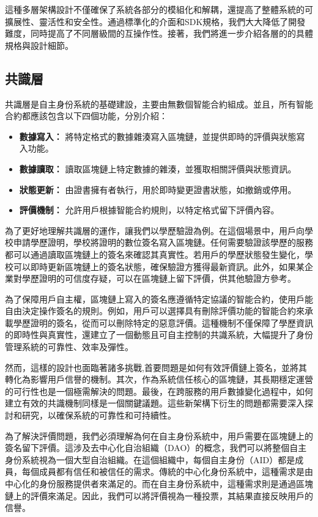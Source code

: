這種多層架構設計不僅確保了系統各部分的模組化和解耦，還提高了整體系統的可擴展性、靈活性和安全性。通過標準化的介面和SDK規格，我們大大降低了開發難度，同時提高了不同層級間的互操作性。接著，我們將進一步介紹各層的的具體規格與設計細節。
\subsection{共識層}
共識層是自主身份系統的基礎建設，主要由無數個智能合約組成。並且，所有智能合約都應該包含以下四個功能，分別介紹：
\begin{itemize}
  \item \textbf{數據寫入：} 將特定格式的數據雜湊寫入區塊鏈，並提供即時的評價與狀態寫入功能。
  \item \textbf{數據讀取：} 讀取區塊鏈上特定數據的雜湊，並獲取相關評價與狀態資訊。
  \item \textbf{狀態更新：} 由證書擁有者執行，用於即時變更證書狀態，如撤銷或停用。
  \item \textbf{評價機制：} 允許用戶根據智能合約規則，以特定格式留下評價內容。
\end{itemize}
為了更好地理解共識層的運作，讓我們以學歷驗證為例。在這個場景中，用戶向學校申請學歷證明，學校將證明的數位簽名寫入區塊鏈。任何需要驗證該學歷的服務都可以通過讀取區塊鏈上的簽名來確認其真實性。若用戶的學歷狀態發生變化，學校可以即時更新區塊鏈上的簽名狀態，確保驗證方獲得最新資訊。此外，如果某企業對學歷證明的可信度存疑，可以在區塊鏈上留下評價，供其他驗證方參考。

為了保障用戶自主權，區塊鏈上寫入的簽名應遵循特定協議的智能合約，使用戶能自由決定操作簽名的規則。例如，用戶可以選擇具有刪除評價功能的智能合約來承載學歷證明的簽名，從而可以刪除特定的惡意評價。這種機制不僅保障了學歷資訊的即時性與真實性，還建立了一個動態且可自主控制的共識系統，大幅提升了身份管理系統的可靠性、效率及彈性。

然而，這樣的設計也面臨著諸多挑戰,首要問題是如何有效評價鏈上簽名，並將其轉化為影響用戶信譽的機制。其次，作為系統信任核心的區塊鏈，其長期穩定運營的可行性也是一個極需解決的問題。最後，在跨服務的用戶數據變化過程中，如何建立有效的共識機制同樣是一個關鍵議題。這些新架構下衍生的問題都需要深入探討和研究，以確保系統的可靠性和可持續性。

為了解決評價問題，我們必須理解為何在自主身份系統中，用戶需要在區塊鏈上的簽名留下評價。這涉及去中心化自治組織（DAO）的概念，我們可以將整個自主身份系統視為一個大型自治組織。在這個組織中，每個自主身份（AID）都是成員，每個成員都有信任和被信任的需求。傳統的中心化身份系統中，這種需求是由中心化的身份服務提供者來滿足的。而在自主身份系統中，這種需求則是通過區塊鏈上的評價來滿足。因此，我們可以將評價視為一種投票，其結果直接反映用戶的信譽。


